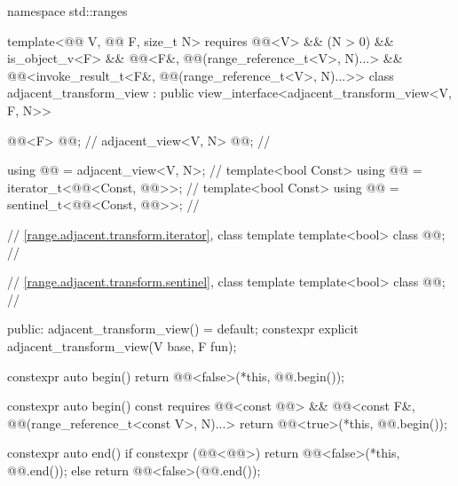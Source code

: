 %
%
%
\begin{codeblock}
namespace std::ranges {
  template<@@ V, @@ F, size_t N>
    requires @@<V> && (N > 0) && is_object_v<F> &&
             @@<F&, @@(range_reference_t<V>, N)...> &&
             @@<invoke_result_t<F&, @@(range_reference_t<V>, N)...>>
  class adjacent_transform_view : public view_interface<adjacent_transform_view<V, F, N>> {
    @@<F> @@;                        // \expos
    adjacent_view<V, N> @@;                 // \expos

    using @@ = adjacent_view<V, N>;      // \expos
    template<bool Const>
      using @@ = iterator_t<@@<Const, @@>>;         // \expos
    template<bool Const>
      using @@ = sentinel_t<@@<Const, @@>>;         // \expos

    // \ref{range.adjacent.transform.iterator}, class template 
    template<bool> class @@;              // \expos

    // \ref{range.adjacent.transform.sentinel}, class template 
    template<bool> class @@;              // \expos

  public:
    adjacent_transform_view() = default;
    constexpr explicit adjacent_transform_view(V base, F fun);

    constexpr auto begin() {
      return @@<false>(*this, @@.begin());
    }

    constexpr auto begin() const
      requires @@<const @@> &&
               @@<const F&, @@(range_reference_t<const V>, N)...> {
      return @@<true>(*this, @@.begin());
    }

    constexpr auto end() {
      if constexpr (@@<@@>) {
        return @@<false>(*this, @@.end());
      } else {
        return @@<false>(@@.end());
      }
    }

}}
\end{codeblock}
